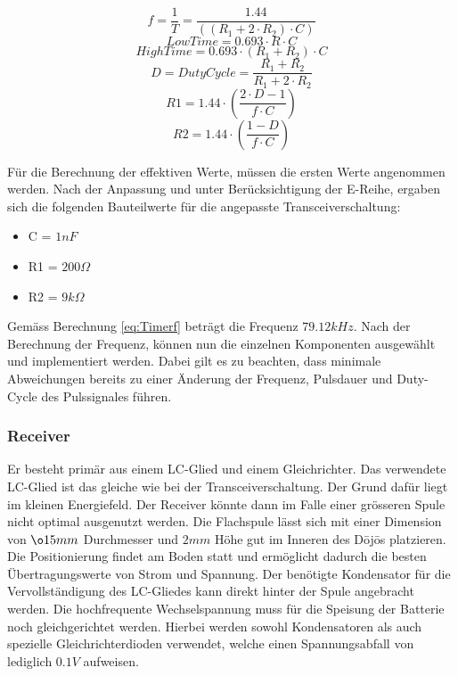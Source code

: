 \begin{equation}\label{eq:Timerf}
f= \dfrac{1}{T}= \dfrac{1.44}{((R_{1} + 2 \cdot R_{2})\cdot C)}
\end{equation}
\begin{equation}\label{eq:TimerTL}
LowTime= 0.693 \cdot R \cdot C
\end{equation}
\begin{equation}\label{eq:TimerTH}
HighTime= 0.693 \cdot (R_{1} + R_{2}) \cdot C
\end{equation}
\begin{equation}\label{eq:TimerDC}
D = DutyCycle = \dfrac{R_{1} + R_{2}}{R_{1} + 2 \cdot R_{2}}
\end{equation}
\begin{equation}\label{eq:TimerR1}
R1 = 1.44 \cdot \left( \dfrac{2 \cdot D - 1}{f \cdot C} \right)
\end{equation}
\begin{equation}\label{eq:TimerR2}
R2 = 1.44 \cdot \left( \dfrac{1-D}{f \cdot C} \right)
\end{equation} 

Für die Berechnung der effektiven Werte, müssen die ersten Werte angenommen werden. Nach der Anpassung und unter Berücksichtigung der E-Reihe, ergaben sich die folgenden Bauteilwerte für die angepasste Transceiverschaltung:

\begin{itemize}
\item C = $1nF$
\item R1 = $200\Omega$
\item R2 = $9k\Omega$
\end{itemize}
 
Gemäss Berechnung \ref{eq:Timerf} beträgt die Frequenz $79.12kHz$. Nach der Berechnung der Frequenz, können nun die einzelnen Komponenten ausgewählt und implementiert werden. Dabei gilt es zu beachten, dass minimale Abweichungen bereits zu einer Änderung der Frequenz, Pulsdauer und Duty-Cycle des Pulssignales führen.

\subsubsection*{Receiver}
Er besteht primär aus einem LC-Glied und einem Gleichrichter. Das verwendete LC-Glied ist das gleiche wie bei der Transceiverschaltung. Der Grund dafür liegt im kleinen Energiefeld. Der Receiver könnte dann im Falle einer grösseren Spule nicht optimal ausgenutzt werden. Die Flachspule lässt sich mit einer Dimension von $\o 15mm$ Durchmesser und $2mm$ Höhe gut im Inneren des Dōjōs platzieren. Die Positionierung findet am Boden statt und ermöglicht dadurch die besten Übertragungswerte von Strom und Spannung. Der benötigte Kondensator für die Vervollständigung des LC-Gliedes kann direkt hinter der Spule angebracht werden. Die hochfrequente Wechselspannung muss für die Speisung der Batterie noch gleichgerichtet werden. Hierbei werden sowohl Kondensatoren als auch spezielle Gleichrichterdioden verwendet, welche einen Spannungsabfall von lediglich $0.1V$ aufweisen.
